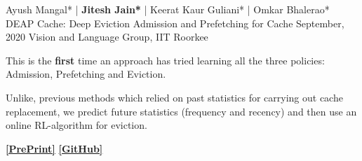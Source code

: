 

\begin{cventries}

  \cventry
    {Ayush Mangal* | \textbf{Jitesh Jain*} | Keerat Kaur Guliani* | Omkar Bhalerao*} %
    {DEAP Cache: Deep Eviction Admission and Prefetching for Cache} 
    {September, 2020} %
    {Vision and Language Group, IIT Roorkee} 
    {
      \begin{cvitems} %
        \item{This is the \textbf{first} time an approach has tried learning all the three policies: Admission, Prefetching and Eviction.}
        \item{Unlike, previous methods which relied on past statistics for carrying out cache replacement, we predict future statistics (frequency and recency) and then use an online RL-algorithm for eviction.}
        \item{{\href{https://arxiv.org/abs/2009.09206}{\bf [PrePrint]}} {\href{https://github.com/vlgiitr/deep_cache_replacement}{\bf [GitHub]}}}
      \end{cvitems}
    }
    
\end{cventries}
